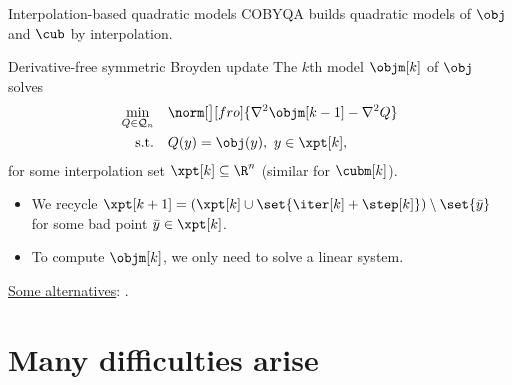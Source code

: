 \documentclass[optimization]{common/talk}
\begin{document}
\begin{frame}{Interpolation-based quadratic models}
    COBYQA builds \alert{quadratic} models of $\obj$ and $\cub$ by interpolation.

    \begin{block}{Derivative-free symmetric Broyden update \parencite{Powell_2004}}
        The $k$th model $\objm[k]$ of $\obj$ solves
        \begin{align*}
            \min_{Q \in \mathcal{Q}_n}  & \quad \norm[\big][fro]{\nabla^2 \objm[k - 1] - \nabla^2 Q}\\
            \textrm{s.t.}               & \quad Q(y) = \obj(y), ~ y \in \xpt[k],
        \end{align*}
        for some interpolation set $\xpt[k] \subseteq \R^n$ (similar for $\cubm[k]$).
    \end{block}

    \begin{itemize}
        \item We \alert{recycle} $\xpt[k + 1] = ( \xpt[k] \cup \set{\iter[k] + \step[k]} ) \setminus \set{\bar{y}}$ for some bad point $\bar{y} \in \xpt[k]$.
        \item To compute $\objm[k]$, we only need to solve a \alert{linear} system.
    \end{itemize}

    \underline{Some alternatives}: \textcite{Conn_Scheinberg_Toint_1997a,Conn_Scheinberg_Toint_1997b,Conn_Scheinberg_Toint_1998,Wild_2008,Custodio_Rocha_Vicente_2010,Bandeira_Scheinberg_Vicente_2012,Zhang_2014,Xie_Yuan_2023}.
\end{frame}

\section{Many difficulties arise}
\end{document}

